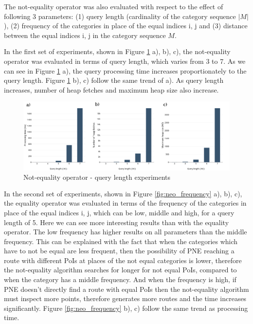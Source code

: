 The not-equality operator was also evaluated with respect to the effect of following 3 parameters: (1) query length (cardinality of the category sequence $|M|$), (2) frequency of the categories in place of the equal indices i, j and (3) distance between the equal indices i, j in the category sequence $M$.

In the first set of experiments, shown in Figure \ref{fig:neo_length} a), b), c), the not-equality operator was evaluated in terms of query length, which varies from 3 to 7. As we can see in Figure \ref{fig:neo_length} a), the query processing time increases proportionately to the query length. Figure \ref{fig:neo_length} b), c) follow the same trend of a). As query length increases, number of heap fetches and maximum heap size also increase.

\begin{figure}[H]
	\includegraphics[scale=0.3]{images/neo_length.png}
	\centering
	\caption{Not-equality operator - query length experiments}
	\label{fig:neo_length}
\end{figure}

In the second set of experiments, shown in Figure \ref{fig:neo_frequency} a), b), c), the equality operator was evaluated in terms of the frequency of the categories in place of the equal indices i, j, which can be low, middle and high, for a query length of 5.  
Here we can see more interesting results than with the equality operator. The low frequency has higher results on all parameters than the middle frequency. This can be explained with the fact that when the categories which have to not be equal are less frequent, then the possibility of PNE reaching a route with different PoIs at places of the not equal categories is lower, therefore the not-equality algorithm searches for longer for not equal PoIs, compared to when the category has a middle frequency. And when the frequency is high, if PNE doesn't directly find a route with equal PoIs then the not-equality algorithm must inspect more points, therefore generates more routes and the time increases significantly. 
Figure \ref{fig:neo_frequency} b), c) follow the same trend as processing time.

